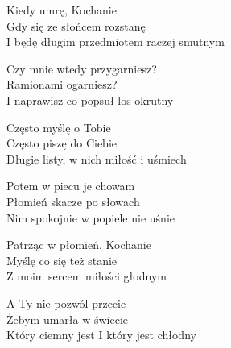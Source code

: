 \begin{text}
    Kiedy umrę, Kochanie\\
    Gdy się ze słońcem rozstanę\\
    I będę długim przedmiotem raczej smutnym

    Czy mnie wtedy przygarniesz?\\
    Ramionami ogarniesz?\\
    I naprawisz co popsuł los okrutny

    Często myślę o Tobie\\
    Często piszę do Ciebie\\
    Długie listy, w nich miłość i uśmiech

    Potem w piecu je chowam\\
    Płomień skacze po słowach\\
    Nim spokojnie w popiele nie uśnie

    Patrząc w płomień, Kochanie\\
    Myślę co się też stanie\\
    Z moim sercem miłości głodnym

    A Ty nie pozwól przecie\\
    Żebym umarła w świecie\\
    Który ciemny jest I który jest chłodny
\end{text}
\begin{chord}

\end{chord}